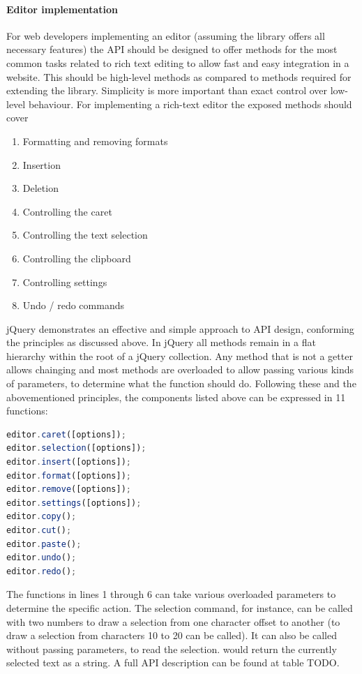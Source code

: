 \paragraph{Editor implementation}

For web developers implementing an editor (assuming the library offers all necessary features) the API should be designed to offer methods for the most common tasks related to rich text editing to allow fast and easy integration in a website. This should be high-level methods as compared to methods required for extending the library. Simplicity is more important than exact control over low-level behaviour. For implementing a rich-text editor the exposed methods should cover

\begin{enumerate}
\item Formatting and removing formats
\item Insertion
\item Deletion
\item Controlling the caret
\item Controlling the text selection
\item Controlling the clipboard
\item Controlling settings
\item Undo / redo commands
\end{enumerate}

\noindent jQuery demonstrates an effective and simple approach to API design, conforming the principles as discussed above. In jQuery all methods remain in a flat hierarchy within the root of a jQuery collection. Any method that is not a getter allows chainging and most methods are overloaded to allow passing various kinds of parameters, to determine what the function should do. Following these and the abovementioned principles, the components listed above can be expressed in 11 functions:

\begin{lstlisting}[language=JavaScript, caption=API for implementing a rich-text editor, label=lst:rich_text_api]
editor.caret([options]);
editor.selection([options]);
editor.insert([options]);
editor.format([options]);
editor.remove([options]);
editor.settings([options]);
editor.copy();
editor.cut();
editor.paste();
editor.undo();
editor.redo();
\end{lstlisting}

\noindent The functions in lines 1 through 6 can take various overloaded parameters to determine the specific action. The selection command, for instance, can be called with two numbers to draw a selection from one character offset to another (to draw a selection from characters 10 to 20  can be called). It can also be called without passing parameters, to read the selection.  would return the currently selected text as a string. A full API description can be found at table TODO.

